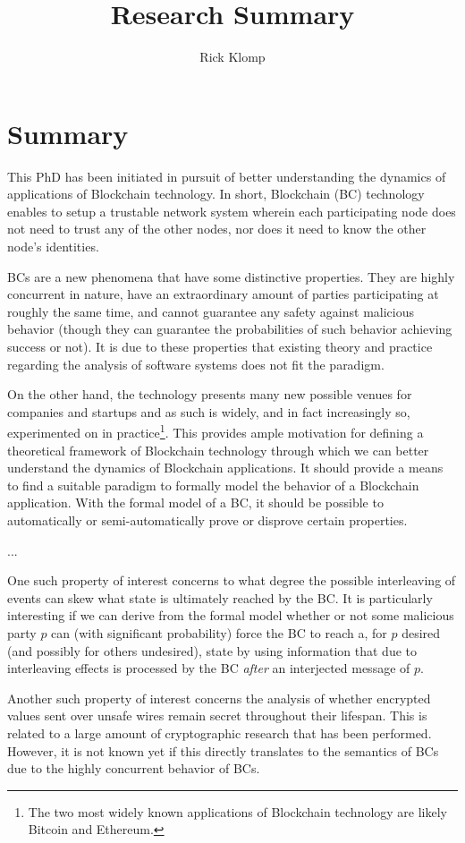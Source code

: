 \documentclass[]{article}
\title{Research Summary}
\author{Rick Klomp}
\begin{document}
\maketitle

\section{Summary}
This PhD has been initiated in pursuit of better understanding the dynamics of applications of Blockchain technology. In short, Blockchain (BC) technology enables to setup a trustable network system wherein each participating node does not need to trust any of the other nodes, nor does it need to know the other node's identities.

BCs are a new phenomena that have some distinctive properties. They are highly concurrent in nature, have an extraordinary amount of parties participating at roughly the same time, and cannot guarantee any safety against malicious behavior (though they can guarantee the probabilities of such behavior achieving success or not). It is due to these properties that existing theory and practice regarding the analysis of software systems does not fit the paradigm.

On the other hand, the technology presents many new possible venues for companies and startups and as such is widely, and in fact increasingly so, experimented on in practice\footnote{
	The two most widely known applications of Blockchain technology are likely Bitcoin and Ethereum.
}. This provides ample motivation for defining a theoretical framework of Blockchain technology through which we can better understand the dynamics of Blockchain applications. It should provide a means to find a suitable paradigm to formally model the behavior of a Blockchain application. With the formal model of a BC, it should be possible to automatically or semi-automatically prove or disprove certain properties.

...

One such property of interest concerns to what degree the possible interleaving of events can skew what state is ultimately reached by the BC. It is particularly interesting if we can derive from the formal model whether or not some malicious party $p$ can (with significant probability) force the BC to reach a, for $p$ desired (and possibly for others undesired), state by using information that due to interleaving effects is processed by the BC \emph{after} an interjected message of $p$.

Another such property of interest concerns the analysis of whether encrypted values sent over unsafe wires remain secret throughout their lifespan. This is related to a large amount of cryptographic research that has been performed. However, it is not known yet if this directly translates to the semantics of BCs due to the highly concurrent behavior of BCs.
\end{document}

